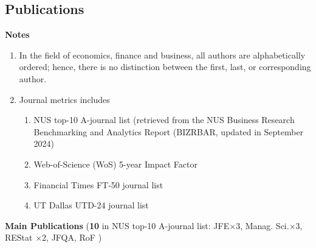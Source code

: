 \documentclass[11pt]{article}
\begin{document}
\subsection{Publications}
\textbf{Notes}
\begin{enumerate}[label=\arabic*.,leftmargin=1.8em,itemsep=0.5em]
\item In the field of economics, finance and business, all authors are alphabetically ordered; hence, there is no distinction between the first, last, or corresponding author.
\item Journal metrics includes 
\begin{enumerate}
	\item NUS top-10 A-journal list (retrieved from the NUS Business Research Benchmarking and Analytics Report (BIZRBAR, updated in September 2024)
	\item Web-of-Science (WoS) 5-year Impact Factor
	\item Financial Times FT-50 journal list
	\item UT Dallas UTD-24 journal list
\end{enumerate}
\end{enumerate}
\vspace{0.45em}
\textbf{Main Publications} (\textbf{10} in NUS top-10 A-journal list: JFE$\times$3, Manag. Sci.$\times$3, REStat $\times$2, JFQA, RoF ) 
\end{document}
